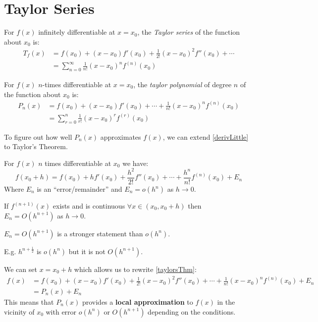 \documentclass[../main.tex]{subfiles}
\begin{document}
\section{Taylor Series}
\begin{definition}
 For $f(x)$ infinitely differentiable at $x = x_0$, the \textit{Taylor series} of the function about $x_0$ is:
 \begin{align*}
   T_f(x) &= f(x_0) + (x - x_0)f'(x_0) + \frac{1}{2!}(x - x_0)^2 f''(x_0) + \cdots \\
          &= \sum_{n=0}^{\infty} \frac{1}{n!} (x-x_0)^{n} f^{(n)}(x_0)
 \end{align*}
\end{definition}
\begin{definition}
  For $f(x)$ $n$-times differentiable at $x = x_0$, the \textit{taylor polynomial} of degree $n$ of the function about $x_0$ is:
  \begin{align*}
    P_n(x) &= f(x_0) + (x - x_0)f'(x_0) + \cdots + \frac{1}{n!} (x - x_0)^{n} f^{(n)}(x_0) \\
           &= \sum_{r=0}^{n} \frac{1}{r!} (x-x_0)^{r} f^{(r)}(x_0)
  \end{align*}
\end{definition}
To figure out how well $P_n(x)$ approximates $f(x)$, we can extend \cref{derivLittle} to Taylor's Theorem.
\begin{theorem}
  For $f(x)$ $n$ times differentiable at $x_0$ we have:
  \[
    f(x_0 + h) = f(x_0) + hf'(x_0) + \frac{h^2}{2!}f''(x_0) + \cdots + \frac{h^{n}}{n!} f^{(n)} (x_0) + E_n
  \]
  Where $E_n$ is an ``error/remainder'' and $E_n = o(h^{n})$ as $h \to 0$.

  If $f^{(n+1)}(x)$ exists and is continuous $\forall x \in (x_0, x_0 + h)$ then $E_n = O(h^{n+1})$ as $h \to 0$.
  \label{taylorsThm}
\end{theorem}
\begin{remark}
  $E_n = O(h^{n + 1})$ is  a stronger statement than $o(h^{n})$.

  E.g. $h^{n + \frac{1}{2}}$ is $o(h^{n})$ but it is not $O(h^{n + 1})$.
\end{remark}
We can set $x = x_0 + h$ which allows us to rewrite \cref{taylorsThm}:
\begin{align*}
  f(x) &= f(x_0) + (x - x_0)f'(x_0) + \frac{1}{2!}(x - x_0)^2f''(x_0) + \cdots + \frac{1}{n!}(x - x_0)^{n} f^{(n)}(x_0) + E_n \\
       &= P_n(x) + E_n
\end{align*}
This means that $P_n(x)$ provides a \textbf{local approximation} to $f(x)$ in the vicinity of $x_0$ with error $o(h^{n})$ or $O(h^{n + 1})$ depending on the conditions.
\end{document}
